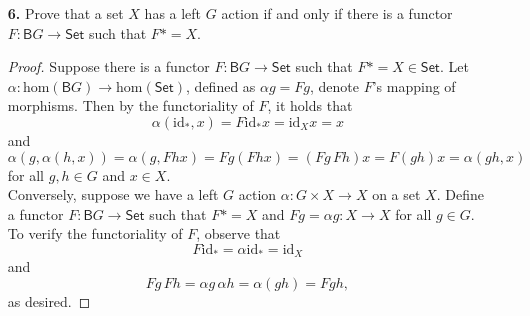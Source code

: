 \documentclass[ 12pt ]{article}
\begin{document}
\begin{enumerate}
	\item[\textbf{6.}] Prove that a set $X$ has a left $G$ action if and only if there is a functor $F : \mathsf{B}G \to \mathsf{Set}$ such that $F \ast = X$.

		\begin{proof}
			Suppose there is a functor $F : \mathsf{B}G \to \mathsf{Set}$ such that $F \ast = X \in \mathsf{Set}$. Let $\alpha : \mathrm{hom}(\mathsf{B}G) \to \mathrm{hom}(\mathsf{Set})$, defined as $\alpha g = Fg$, denote $F$'s mapping of morphisms. Then by the functoriality of $F$, it holds that $$\alpha(\mathrm{id}_\ast, x) = F \mathrm{id}_\ast x = \mathrm{id}_X x = x$$ and $$\alpha(g, \alpha(h, x)) = \alpha(g, Fhx) = Fg(Fhx) = (Fg\, Fh)x = F(gh)x = \alpha(gh, x)$$ for all $g, h \in G$ and $x \in X$. \\

			Conversely, suppose we have a left $G$ action $\alpha : G \times X \to X$ on a set $X$. Define a functor $F : \mathsf{B}G \to \mathsf{Set}$ such that $F \ast = X$ and $Fg = \alpha g : X \to X$ for all $g \in G$. To verify the functoriality of $F$, observe that $$F \mathrm{id}_\ast = \alpha \mathrm{id}_\ast = \mathrm{id}_X$$ and $$Fg\, Fh = \alpha g\, \alpha h = \alpha(gh) = F gh,$$ as desired.
		\end{proof}

\end{enumerate}
\end{document}
